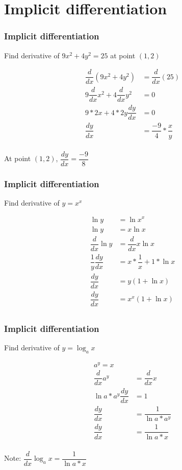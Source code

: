 \documentclass[t]{beamer}
\theoremstyle{plain}
\theoremstyle{definition}
\begin{document}
\section{Implicit differentiation}

\begin{frame}
\frametitle{Implicit differentiation}

	Find derivative of $9x^2 + 4y^2 = 25$ at point $(1, 2)$
		
	\begin{align*}
  	\dfrac{d}{dx}(9x^2 + 4y^2) &= \dfrac{d}{dx}(25)\\
  	9 \dfrac{d}{dx}x^2 + 4 \dfrac{d}{dx} y^2 &= 0\\
  	9 * 2x + 4 * 2y \dfrac{dy}{dx} &= 0\\
  	\dfrac{dy}{dx} &= \dfrac{-9}{4} * \dfrac{x}{y}\\
	\end{align*}	

	\vspace{-2em}	
	
	At point $(1, 2)$,  $\dfrac{dy}{dx} = \dfrac{-9}{8}$

\end{frame}

\begin{frame}
\frametitle{Implicit differentiation}

	Find derivative of $y = x^x$
		
	\begin{align*}
  	\ln{y} &= \ln{x^x}\\
  	\ln{y} &= x\ln{x}\\
  	\dfrac{d}{dx}\ln{y} &=   	\dfrac{d}{dx}x\ln{x}\\
  	 \dfrac{1}{y}\dfrac{dy}{dx} &=   x * \dfrac{1}{x} + 1 * \ln{x}\\
  	 \dfrac{dy}{dx} &= y(1 + \ln{x})\\
  	 \dfrac{dy}{dx} &= x^x(1 + \ln{x})\\
	\end{align*}	
	
\end{frame}

\begin{frame}
\frametitle{Implicit differentiation}

	Find derivative of $y = \log_a{x}$
		
	\begin{align*}
    a^y = x\\
  	\dfrac{d}{dx}a^y &=   	\dfrac{d}{dx}x\\
  	 \ln{a}*a^y\dfrac{dy}{dx} &=  1\\
  	 \dfrac{dy}{dx} &=\dfrac{1}{\ln{a}*a^y}\\
  	 \dfrac{dy}{dx} &=\dfrac{1}{\ln{a}*x}\\
	\end{align*}	
	
	\vspace{-2em}
	
Note: $\dfrac{d}{dx}\log_a{x} = \dfrac{1}{\ln{a}*x}$
	
\end{frame}
\end{document}
